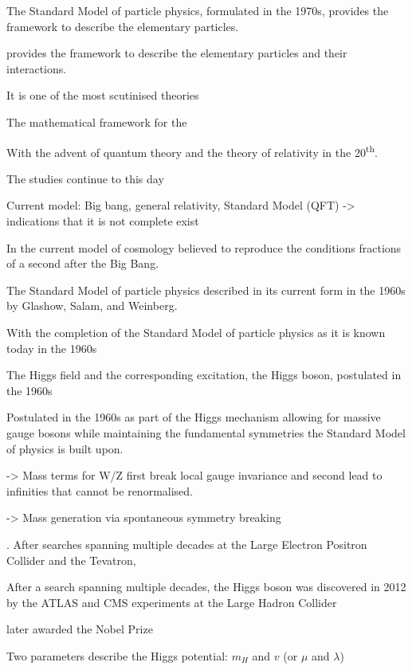 The Standard Model of particle physics, formulated in the 1970s, provides the
framework to describe the elementary particles.

provides the framework to describe the
elementary particles and their interactions.

It is one of the most scutinised theories

The mathematical framework for the


With the advent of quantum theory and the theory of relativity in the
20\textsuperscript{th}.



The studies continue to this day

Current model: Big bang, general relativity, Standard Model (QFT)
-> indications that it is not complete exist

In the current model of cosmology believed to reproduce the conditions fractions
of a second after the Big Bang.


The Standard Model of particle physics described in its current form in the
1960s by Glashow, Salam, and Weinberg.

With the completion of the Standard Model of particle physics as it is known
today in the 1960s

The Higgs field and the corresponding excitation, the Higgs boson, postulated in
the 1960s

\cite{Englert:1964et,Higgs:1964pj}


Postulated in the 1960s as part of the Higgs mechanism allowing for massive
gauge bosons while maintaining the fundamental symmetries the Standard Model of
physics is built upon.


-> Mass terms for W/Z first break local gauge invariance and second lead to
infinities that cannot be renormalised.

-> Mass generation via spontaneous symmetry breaking


. After searches spanning multiple decades at the Large Electron
Positron Collider and the Tevatron,

After a search spanning multiple decades, the Higgs boson was discovered in 2012
by the ATLAS and CMS experiments at the Large Hadron Collider

later awarded the Nobel Prize






Two parameters describe the Higgs potential: $m_{H}$ and $v$ (or $\mu$ and
$\lambda$)

